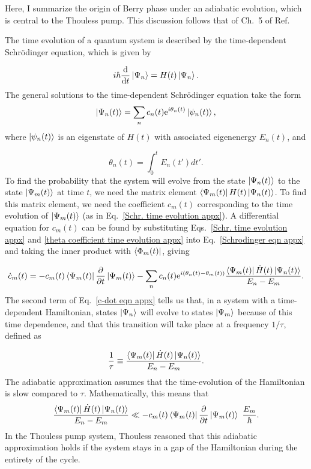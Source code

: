 \documentclass{beavtex_dub_edit}
\begin{document}
Here, I summarize the origin of Berry phase under an adiabatic evolution, which is central to the Thouless pump. This discussion follows that of Ch.\ 5 of Ref.\ \cite{sakurai_modern_1985}

The time evolution of a quantum system is described by the time-dependent Schrödinger equation, which is given by

\begin{equation}
    i \hbar \derivative{t}\ket{\Psi_n} = H(t)\ket{\Psi_n}. \label{Schrodinger eqn appx}
\end{equation}
The general solutions to the time-dependent Schrödinger equation take the form
\begin{equation}
    \ket{\Psi_n(t)} = \sum_n c_n(t) \mathrm{e}^{i \theta_n(t)} \ket{\psi_n(t)}, \label{Schr. time evolution appx}
\end{equation}
where $\ket{\psi_n(t)}$ is an eigenstate of $H(t)$ with associated eigenenergy $E_n(t)$, and 

\begin{equation}
    \theta_n(t) = \int_{0}^{t}E_n(t')dt'. \label{theta coefficient time evolution appx}
\end{equation}
To find the probability that the system will evolve from the state $\ket{\Psi_n(t)}$ to the state $\ket{\Psi_m(t)}$ at time $t$, we need the matrix element $\bra{\Psi_m(t)}H(t)\ket{\Psi_n(t)}$. To find this matrix element, we need the coefficient $c_m(t)$ corresponding to the time evolution of $\ket{\Psi_m(t)}$ (as in Eq.\ \ref{Schr. time evolution appx}). A differential equation for $c_m(t)$ can be found by substituting Eqs.\ \ref{Schr. time evolution appx} and \ref{theta coefficient time evolution appx} into Eq.\ \ref{Schrodinger eqn appx} and taking the inner product with $\bra{\Phi_m(t)}$, giving \cite[p.\ 347]{sakurai_modern_1985}

\begin{equation}
    \dot{c}_m(t) = - c_m(t) \bra{\Psi_m(t)}\pdv{t}\ket{\Psi_m(t)} - \sum_n c_n(t) \mathrm{e}^{i (\theta_n(t) - \theta_m(t))} \frac{\bra{\Psi_m(t)}\dot{H}(t)\ket{\Psi_n(t)}}{E_n - E_m}. \label{c-dot eqn appx}
\end{equation}
The second term of Eq.\ \ref{c-dot eqn appx} tells us that, in a system with a time-dependent Hamiltonian, states $\ket{\Psi_n}$ will evolve to states $\ket{\Psi_m}$ because of this time dependence, and that this transition will take place at a frequency $1/\tau$, defined as 

\begin{equation}
    \frac{1}{\tau} \equiv \frac{\bra{\Psi_m(t)}\dot{H}(t)\ket{\Psi_n(t)}}{E_n - E_m}.
\end{equation}
The adiabatic approximation assumes that the time-evolution of the Hamiltonian is slow compared to $\tau$. Mathematically, this means that
\begin{equation}
    \frac{\bra{\Psi_m(t)}\dot{H}(t)\ket{\Psi_n(t)}}{E_n - E_m} \ll - c_m(t) \bra{\Psi_m(t)}\pdv{t}\ket{\Psi_m(t)} ~ \frac{E_m}{\hbar}. \label{adiabatic approximation condition appx}
\end{equation}
In the Thouless pump system, Thouless reasoned that this adiabatic approximation holds if the system stays in a gap of the Hamiltonian during the entirety of the cycle.
\end{document}
